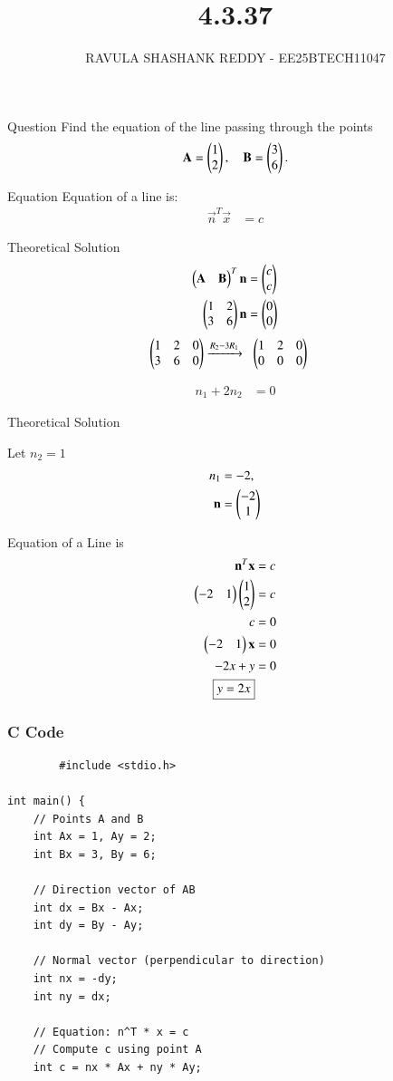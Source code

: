 \documentclass{beamer}
\title %
{4.3.37}
\author %
{RAVULA SHASHANK REDDY - EE25BTECH11047}
\begin{document}
	\frame{\titlepage}
	\begin{frame}{Question}
Find the equation of the line passing through the points  
\[
\mathbf{A} = \begin{pmatrix}1 \\ 2\end{pmatrix}, 
\quad 
\mathbf{B} = \begin{pmatrix}3 \\ 6\end{pmatrix}.
\]
\end{frame}
\begin{frame}{Equation}
Equation of a line is:
\begin{align*}
\vec{n}^T \vec{x} &= c 
    \end{align*}
\end{frame}
\begin{frame}{Theoretical Solution}
   \begin{align}
\begin{pmatrix}\mathbf{A}&\mathbf{B}\end{pmatrix}^T\mathbf{n} &= \begin{pmatrix}c\\c\end{pmatrix}\\
\begin{pmatrix}1 & 2 \\ 3 & 6\end{pmatrix}\mathbf{n} &= \begin{pmatrix}0 \\ 0\end{pmatrix} 
\end{align}
\begin{align}
\begin{pmatrix}1 & 2 & 0 \\ 3 & 6 & 0\end{pmatrix} & 
\xrightarrow{R_2 - 3R_1}\;\;
\begin{pmatrix}1 & 2 & 0 \\ 0 & 0 & 0\end{pmatrix} 
\end{align}

\begin{align}
n_1 + 2n_2 &= 0 
\end{align}
\end{frame}
\begin{frame}{Theoretical Solution}

Let $n_2=1$
\begin{align}
n_1 &= -2, \\
\mathbf{n} &= \begin{pmatrix}-2 \\ 1\end{pmatrix}
\end{align}

Equation of a Line is
\begin{align}
\mathbf{n}^T \mathbf{x} &= c \\
\begin{pmatrix}-2 & 1\end{pmatrix}\begin{pmatrix}1 \\ 2\end{pmatrix} &= c \\
c &= 0 \\
\begin{pmatrix}-2 & 1\end{pmatrix}\mathbf{x} &= 0 \\
-2x + y &= 0 \\
\boxed{y = 2x}
\end{align}
\end{frame}
\begin{frame}[fragile]
    \frametitle{C Code}
    \begin{lstlisting}
        #include <stdio.h>

int main() {
    // Points A and B
    int Ax = 1, Ay = 2;
    int Bx = 3, By = 6;

    // Direction vector of AB
    int dx = Bx - Ax;
    int dy = By - Ay;

    // Normal vector (perpendicular to direction)
    int nx = -dy;
    int ny = dx;

    // Equation: n^T * x = c
    // Compute c using point A
    int c = nx * Ax + ny * Ay;
\end{lstlisting}
\end{frame}
\end{document}

